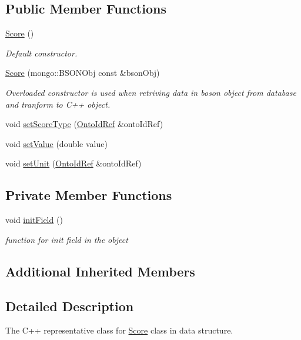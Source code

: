 \subsection*{Public Member Functions}
\begin{DoxyCompactItemize}
\item 
\hyperlink{classunisys_1_1Score_acb7e200a5e4adc5d740eb37fbd28657f}{Score} ()
\begin{DoxyCompactList}\small\item\em Default constructor. \end{DoxyCompactList}\item 
\hyperlink{classunisys_1_1Score_aceecffa613f9aa5f30e28d06d9723011}{Score} (mongo\-::\-B\-S\-O\-N\-Obj const \&bson\-Obj)
\begin{DoxyCompactList}\small\item\em Overloaded constructor is used when retriving data in boson object from database and tranform to C++ object. \end{DoxyCompactList}\item 
void \hyperlink{classunisys_1_1Score_a18b81a6ebf1e0f892bf332e1fba46abf}{set\-Score\-Type} (\hyperlink{classunisys_1_1OntoIdRef}{Onto\-Id\-Ref} \&onto\-Id\-Ref)
\item 
void \hyperlink{classunisys_1_1Score_a161dff3485bb432219ed2e2968989a1f}{set\-Value} (double value)
\item 
void \hyperlink{classunisys_1_1Score_a395e9276ac7a5219eb449f8119603af9}{set\-Unit} (\hyperlink{classunisys_1_1OntoIdRef}{Onto\-Id\-Ref} \&onto\-Id\-Ref)
\end{DoxyCompactItemize}
\subsection*{Private Member Functions}
\begin{DoxyCompactItemize}
\item 
void \hyperlink{classunisys_1_1Score_a3fece7415530d4b577fffcb284535c05}{init\-Field} ()
\begin{DoxyCompactList}\small\item\em function for init field in the object \end{DoxyCompactList}\end{DoxyCompactItemize}
\subsection*{Additional Inherited Members}


\subsection{Detailed Description}
The C++ representative class for \hyperlink{classunisys_1_1Score}{Score} class in data structure. 

